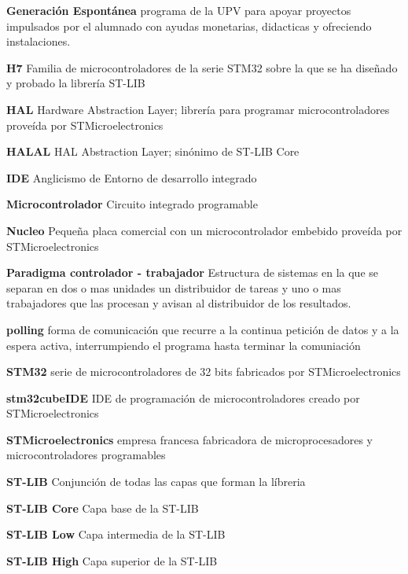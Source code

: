 \documentclass{report}
\begin{document}
\par \vspace{0.2 cm}
\textbf{Generación Espontánea} programa de la UPV para apoyar proyectos impulsados por el alumnado con ayudas monetarias, didacticas y ofreciendo instalaciones. 
\par \vspace{0.2 cm}
\textbf{H7} Familia de microcontroladores de la serie STM32 sobre la que se ha diseñado y probado la librería ST-LIB
\par \vspace{0.2 cm}
\textbf{HAL} Hardware Abstraction Layer; librería para programar microcontroladores proveída por STMicroelectronics
\par \vspace{0.2 cm}
\textbf{HALAL} HAL Abstraction Layer; sinónimo de ST-LIB Core
\par \vspace{0.2 cm}
\textbf{IDE} Anglicismo de Entorno de desarrollo integrado
\par \vspace{0.2 cm}
\textbf{Microcontrolador} Circuito integrado programable
\par \vspace{0.2 cm}
\textbf{Nucleo} Pequeña placa comercial con un microcontrolador embebido proveída por STMicroelectronics
\par \vspace{0.2 cm}
\textbf{Paradigma controlador - trabajador} Estructura de sistemas en la que se separan en dos o mas unidades un distribuidor de tareas y uno o mas trabajadores que las procesan y avisan al distribuidor de los resultados. 
\par \vspace{0.2 cm}
\textbf{polling} forma de comunicación que recurre a la continua petición de datos y a la espera activa, interrumpiendo el programa hasta terminar la comuniación
\par \vspace{0.2 cm}
\textbf{STM32} serie de microcontroladores de 32 bits fabricados por STMicroelectronics
\par \vspace{0.2 cm}
\textbf{stm32cubeIDE} IDE de programación de microcontroladores creado por STMicroelectronics
\par \vspace{0.2 cm}
\textbf{STMicroelectronics} empresa francesa fabricadora de microprocesadores y microcontroladores programables
\par \vspace{0.2 cm}
\textbf{ST-LIB} Conjunción de todas las capas que forman la líbreria
\par \vspace{0.2 cm}
\textbf{ST-LIB Core} Capa base de la ST-LIB
\par \vspace{0.2 cm}
\textbf{ST-LIB Low} Capa intermedia de la ST-LIB
\par \vspace{0.2 cm}
\textbf{ST-LIB High} Capa superior de la ST-LIB
\end{document}
